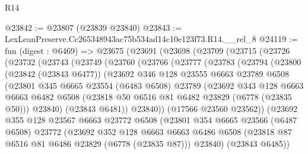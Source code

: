 \begin{lexlean}{R14}
\begin{coremodule}
@23842 := @23807 (@23839 @23840)
@23843 := LexLeanPreserve.Cc265348943ac75b534ad14c10e123f73.R14.__rel_8
@24119 := fun (digest : @6469) =>
  @23675
    (@23691
      (@23698
        (@23709
          (@23715
            (@23726
              (@23732
                (@23743
                  (@23749
                    (@23760
                      (@23766
                        (@23777
                          (@23783
                            (@23794
                              (@23800
                                (@23842 (@23843 @6477))
                                (@23692
                                  @346
                                  @128
                                  @23555
                                  @6663
                                  @23789
                                  @6508
                                  (@23801
                                    @345
                                    @6665
                                    @23554
                                    (@6483 @6508)
                                    @23789
                                    (@23692
                                      @343
                                      @128
                                      @6663
                                      @6663
                                      @6482
                                      @6508
                                      (@23818 @50 @6516 @81 @6482 @23829 (@6778 (@23835 @50)))
                                      @23840)
                                    (@23843 @6481))
                                  @23840))
                              (@17566 @23560 @23562))
                            (@23692
                              @355
                              @128
                              @23567
                              @6663
                              @23772
                              @6508
                              (@23801
                                @354
                                @6665
                                @23566
                                (@6487 @6508)
                                @23772
                                (@23692
                                  @352
                                  @128
                                  @6663
                                  @6663
                                  @6486
                                  @6508
                                  (@23818 @87 @6516 @81 @6486 @23829 (@6778 (@23835 @87)))
                                  @23840)
                                (@23843 @6485))

\end{coremodule}
\end{lexlean}
